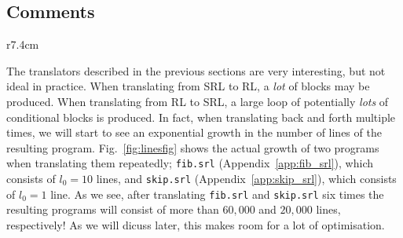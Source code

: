 \pgfplotsset{compat = 1.3}
\subsection{Comments}
\begin{wrapfigure}[19]{r}{7.4cm}
\caption{Program size after translation. }\label{fig:linesfig}%
\end{wrapfigure}
The translators described in the previous sections are very interesting, but not ideal in practice. When translating from SRL to RL, a \textit{lot} of blocks may be produced. When translating from RL to SRL, a large loop of potentially \textit{lots} of conditional blocks is produced. In fact, when translating back and forth multiple times, we will start to see an exponential growth in the number of lines of the resulting program. Fig.~\ref{fig:linesfig} shows the actual growth of two programs when translating them repeatedly; \texttt{fib.srl} (Appendix~\ref{app:fib_srl}), which consists of $l_0=10$ lines, and \texttt{skip.srl} (Appendix~\ref{app:skip_srl}), which consists of $l_0=1$ line. As we see, after translating \texttt{fib.srl} and \texttt{skip.srl} six times the resulting programs will consist of more than $60,000$ and $20,000$ lines, respectively! As we will dicuss later, this makes room for a lot of optimisation.

